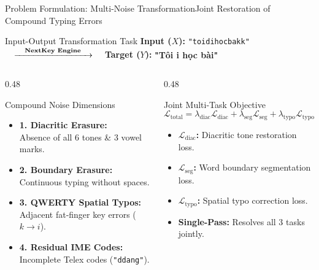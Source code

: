 \documentclass[aspectratio=169,10pt]{beamer}
\begin{document}
\begin{frame}{Problem Formulation: Multi-Noise Transformation}{Joint Restoration of Compound Typing Errors}
  \begin{block}{Input-Output Transformation Task}
    \centering\small
    \textbf{Input ($X$):} \texttt{"toidihocbakk"} $\quad\xrightarrow{\quad\text{\textbf{NextKey Engine}}\quad}\quad$ \textbf{Target ($Y$):} \textbf{"T\^oi \dj i h\d{o}c b\`ai"}
  \end{block}
  \vspace{0.1cm}
  \begin{columns}[T]
    \begin{column}{0.48\textwidth}
      \begin{block}{Compound Noise Dimensions}
        \begin{itemize}\setlength{\itemsep}{2pt}\footnotesize
          \item \textbf{1. Diacritic Erasure:}\\
            Absence of all 6 tones \& 3 vowel marks.
          \item \textbf{2. Boundary Erasure:}\\
            Continuous typing without spaces.
          \item \textbf{3. QWERTY Spatial Typos:}\\
            Adjacent fat-finger key errors ($k \to i$).
          \item \textbf{4. Residual IME Codes:}\\
            Incomplete Telex codes (\texttt{"ddang"}).
        \end{itemize}
      \end{block}
    \end{column}

    \begin{column}{0.48\textwidth}
      \begin{exampleblock}{Joint Multi-Task Objective}
        \begin{equation*}
          \mathcal{L}_{\text{total}} = \lambda_{\text{diac}} \mathcal{L}_{\text{diac}} + \lambda_{\text{seg}} \mathcal{L}_{\text{seg}} + \lambda_{\text{typo}} \mathcal{L}_{\text{typo}}
        \end{equation*}
        \begin{itemize}\setlength{\itemsep}{3pt}\footnotesize
          \item \textbf{$\mathcal{L}_{\text{diac}}$:} Diacritic tone restoration loss.
          \item \textbf{$\mathcal{L}_{\text{seg}}$:} Word boundary segmentation loss.
          \item \textbf{$\mathcal{L}_{\text{typo}}$:} Spatial typo correction loss.
          \item \textbf{Single-Pass:} Resolves all 3 tasks jointly.
        \end{itemize}
      \end{exampleblock}
    \end{column}
  \end{columns}
\end{frame}
\end{document}
